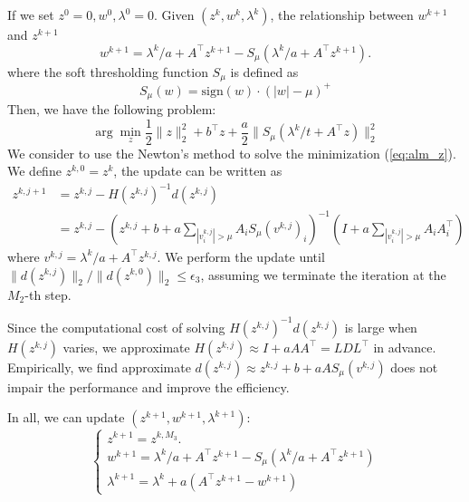 \documentclass{article}
\numberwithin{equation}{section}
\numberwithin{figure}{section}
\begin{document}
If we set $z^0=0,w^0,\lambda^0=0$. Given $(z^k,w^k,\lambda^k)$, the relationship between $w^{k+1}$ and $z^{k+1}$
\begin{equation}
    w^{k+1}=\lambda^k/a+A^\top z^{k+1}-S_{\mu}(\lambda^k/a+A^\top z^{k+1}).
\end{equation}
where the soft thresholding function $S_\mu$ is defined as
\begin{equation}
    S_\mu(w) = \mathrm{sign}(w)\cdot (|w|-\mu)^+
\end{equation}
Then, we have the following problem:
\begin{equation}
\label{eq:alm_z}
    \arg\min_z \frac{1}{2}\|z\|_2^2+b^\top z+\frac{a}{2}\|S_\mu(\lambda^k/t+A^\top z)\|_2^2
\end{equation}
We consider to use the Newton's method to solve the minimization (\ref{eq:alm_z}). We define $z^{k,0}=z^k$, the update can be written as
\begin{equation}
\begin{split}
        z^{k,j+1}&=z^{k,j}-H({z^{k,j}})^{-1}d({z^{k,j}})\\
        &=z^{k,j} - (z^{k,j}+b+a\sum_{|v^{k,j}_i|>\mu}A_iS_\mu(v^{k,j})_i )^{-1}(I+a\sum_{|v^{k,j}_i|>\mu}A_iA_i^\top)
\end{split}
\end{equation}
where $v^{k,j} = \lambda^k/a +A^\top z^{k,j}$.
We perform the update until $\|d(z^{k,j})\|_2/\|d(z^{k,0})\|_2\leq \epsilon_3$, assuming we terminate the iteration at the $M_2$-th step.

Since the computational cost of solving $H({z^{k,j}})^{-1}d({z^{k,j}})$ is large when $H({z^{k,j}})$ varies, we approximate $H({z^{k,j}})\approx I+aAA^\top=LDL^\top$ in advance. Empirically, we find approximate $d({z^{k,j}})\approx {z^{k,j}}+b+aAS_\mu(v^{k,j})$ does not impair the performance and improve the efficiency.

In all, we can update $(z^{k+1},w^{k+1},\lambda^{k+1})$:
\begin{equation}
\label{eq:alm_update}
    \begin{cases}
    z^{k+1}=z^{k,M_3}.\\
    w^{k+1}=\lambda^k/a+A^\top z^{k+1}-S_{\mu}(\lambda^k/a+A^\top z^{k+1})\\
    \lambda^{k+1}=\lambda^k+a(A^\top z^{k+1}-w^{k+1})
    \end{cases}
\end{equation}
\end{document}
